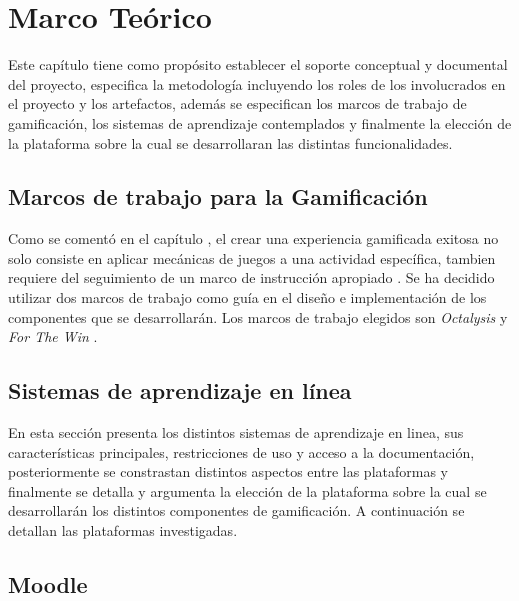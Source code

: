 \chapter{Marco Teórico}
\label{ch:marcoTeorico}

 Este capítulo tiene como propósito establecer el soporte conceptual y documental del proyecto,
 especifica la metodología incluyendo los roles de los involucrados en el proyecto y los artefactos,
 además se especifican los marcos de trabajo de gamificación, los sistemas de aprendizaje contemplados
 y finalmente la elección de la plataforma sobre la cual se desarrollaran las distintas funcionalidades.

    

\section{Marcos de trabajo para la Gamificación}

 Como se comentó en el capítulo , el crear una experiencia
 gamificada exitosa no solo consiste en aplicar mecánicas de juegos a una actividad
 específica, tambien requiere del seguimiento de un marco de instrucción apropiado \cite[p. 1110]{GamInE-Learning}.
 Se ha decidido utilizar dos marcos de trabajo como guía en el diseño e implementación
 de los componentes que se desarrollarán. Los marcos de trabajo elegidos son {\it Octalysis}
 \cite{Octalysis} y {\it For The Win} \cite{ForTheWin}.

    
    

\clearpage
\section{Sistemas de aprendizaje en línea}

 En esta sección presenta los distintos sistemas de aprendizaje en linea, sus características
 principales, restricciones de uso y acceso a la documentación, posteriormente se constrastan
 distintos aspectos entre las plataformas y finalmente se detalla y argumenta la elección de 
 la plataforma sobre la cual se desarrollarán los distintos componentes de gamificación.
 A continuación se detallan las plataformas investigadas.

    

\clearpage
\section{Moodle}

